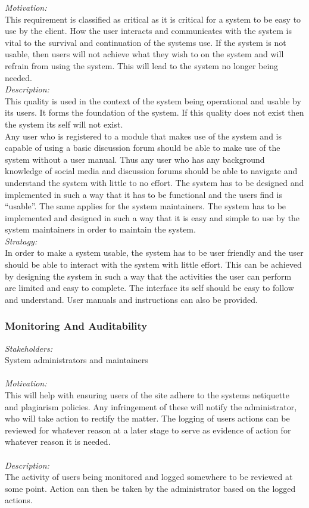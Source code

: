 \documentclass[a4paper,12pt]{report}
\begin{document}
		\emph{Motivation: }\\ This requirement is classified as critical  as it is critical for a system to be easy to use by the client. How the user interacts and communicates with the system is vital to the survival and continuation of the systems use. If the system is not usable, then users will not achieve what they wish to on the system and will refrain from using the system. This will lead to the system no longer being needed. \\
		
		\emph{Description: }\\ This quality is used in the context of the system being operational and usable by its users. It forms the foundation of the system. If this quality does not exist then the system its self will not exist.\\
		Any user who is registered to a module that makes use of the system and is capable of using a basic discussion forum should be able to make use of the system without a user manual. Thus any user who has any background knowledge of social media and discussion forums should be able to navigate and understand the system with little to no effort. The system has to be designed and implemented in such a way that it has to be functional and the users find is “usable”. The same applies for the system maintainers. The system has to be implemented and designed in such a way that it is easy and simple to use by the system maintainers in order to maintain the system.\\
		
		\emph{Stratagy: }\\ In order to make a system usable, the system has to be user friendly and the user should be able to interact with the system with little effort. This can be achieved by designing the system in such a way that the activities the user can perform are limited and easy to complete. The interface its self should be easy to follow and understand. User manuals and instructions can also be provided.\\
		
		\subsubsection{Monitoring And Auditability}
		\emph{Stakeholders: }\\ System administrators and maintainers\\
		\\\emph{Motivation: }\\ This will help with ensuring users of the site adhere to the systems netiquette and plagiarism policies. Any infringement of these will notify the administrator, who will take action to rectify the matter. The logging of users actions can be reviewed for whatever reason at a later stage to serve as evidence of action for whatever reason it is needed. \\
		\\\emph{Description: }\\ The activity of users being monitored and logged somewhere to be reviewed at some point. Action can then be taken by the administrator based on the logged actions. \\	
	
\end{document}
